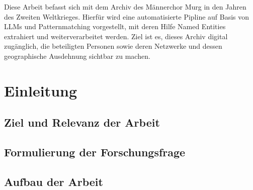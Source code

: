 \documentclass[12pt, a4paper, ngerman, bidi=default]{article}
\renewcommand*\contentsname{Inhaltsverzeichnis}
\newcommand\contentsname{Inhaltsverzeichnis}
\begin{document}
\newpage 
Diese Arbeit befasst sich mit dem Archiv des Männerchor Murg in den Jahren des Zweiten Weltkrieges. 
Hierfür wird eine automatisierte Pipline auf Basis von LLMs und Patternmatching vorgestellt, mit deren Hilfe Named Entities extrahiert und weiterverarbeitet werden. 
Ziel ist es, dieses Archiv digital zugänglich, die beteiligten Personen sowie deren Netzwerke und dessen geographische Ausdehnung sichtbar zu machen.






\newpage
\renewcommand*\contentsname{Inhaltsverzeichnis}%
{
\hypersetup{linkcolor=}
\setcounter{tocdepth}{5}%
\tableofcontents
}


\newpage
\section{Einleitung}
\subsection{Ziel und Relevanz der Arbeit}
\subsection{Formulierung der Forschungsfrage}
\subsection{Aufbau der Arbeit}
\end{document}
